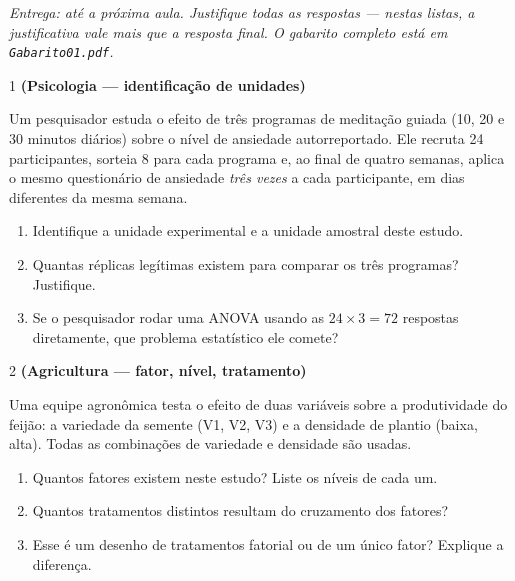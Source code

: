 \documentclass[11pt]{article}
\begin{document}

\noindent \textit{Entrega: até a próxima aula. Justifique todas as respostas — nestas listas, a
justificativa vale mais que a resposta final. O gabarito completo está em \texttt{Gabarito01.pdf}.}

\begin{questao}{1} \textbf{(Psicologia --- identificação de unidades)}

Um pesquisador estuda o efeito de três programas de meditação guiada (10, 20 e 30 minutos
diários) sobre o nível de ansiedade autorreportado. Ele recruta 24 participantes, sorteia 8 para
cada programa e, ao final de quatro semanas, aplica o mesmo questionário de ansiedade \emph{três
vezes} a cada participante, em dias diferentes da mesma semana.

\begin{enumerate}[label=(\alph*)]
  \item Identifique a unidade experimental e a unidade amostral deste estudo.
  \item Quantas réplicas legítimas existem para comparar os três programas? Justifique.
  \item Se o pesquisador rodar uma ANOVA usando as $24 \times 3 = 72$ respostas diretamente,
    que problema estatístico ele comete?
\end{enumerate}
\end{questao}

\begin{questao}{2} \textbf{(Agricultura --- fator, nível, tratamento)}

Uma equipe agronômica testa o efeito de duas variáveis sobre a produtividade do feijão: a
variedade da semente (V1, V2, V3) e a densidade de plantio (baixa, alta). Todas as combinações
de variedade e densidade são usadas.

\begin{enumerate}[label=(\alph*)]
  \item Quantos fatores existem neste estudo? Liste os níveis de cada um.
  \item Quantos tratamentos distintos resultam do cruzamento dos fatores?
  \item Esse é um desenho de tratamentos fatorial ou de um único fator? Explique a diferença.
\end{enumerate}
\end{questao}
\end{document}
